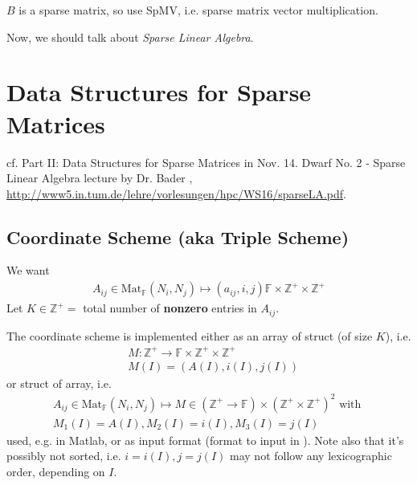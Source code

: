 \documentclass[10pt]{amsart}
\begin{document}
\begin{multicols*}{2}
$B$ is a sparse matrix, so use SpMV, i.e. sparse matrix vector multiplication.  

Now, we should talk about \emph{Sparse Linear Algebra}.  

\section{Data Structures for Sparse Matrices}  

cf. Part II: Data Structures for Sparse Matrices in Nov. 14. Dwarf No. 2 - Sparse Linear Algebra lecture by Dr. Bader \cite{TUMHPC2016}, \url{http://www5.in.tum.de/lehre/vorlesungen/hpc/WS16/sparseLA.pdf}.  

\subsection{Coordinate Scheme (aka Triple Scheme) }

We want
\begin{equation}
\begin{gathered}
A_{ij} \in \text{Mat}_{\mathbb{F}}(N_i,N_j) \mapsto (a_{ij},i,j)\mathbb{F}  \times \mathbb{Z}^+ \times \mathbb{Z}^+
\end{gathered}
\end{equation}
Let $K \in \mathbb{Z}^+ = $ total number of \textbf{nonzero} entries in $A_{ij}$.  

The coordinate scheme is implemented either as an array of struct (of size $K$), i.e. 
\begin{equation}
\begin{aligned}
& M:\mathbb{Z}^+ \to \mathbb{F} \times \mathbb{Z}^+ \times \mathbb{Z}^+ \\
& M(I) = (A(I), i(I), j(I) )
\end{aligned}
\end{equation}
or struct of array, i.e. 
\begin{equation}
	\begin{gathered}
	A_{ij} \in \text{Mat}_{\mathbb{F}}(N_i,N_j) \mapsto M \in (\mathbb{Z}^+ \to \mathbb{F}) \times ( \mathbb{Z^+} \times \mathbb{Z}^+)^2 \text{ with } \\
	M_1(I) = A(I) , M_2(I) = i(I), M_3(I) = j(I)
	\end{gathered}
\end{equation}
used, e.g. in Matlab, or as input format (format to input in ).  Note also that it's possibly not sorted, i.e. $i=i(I), j= j(I)$ may not follow any lexicographic order, depending on $I$.  


\end{multicols*}
\end{document}
